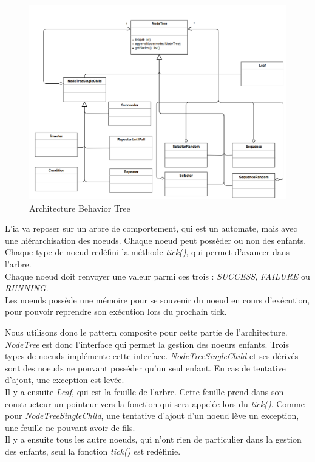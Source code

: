 \begin{figure}[H]
    \centering
    \includegraphics[scale=0.3]{data/archi/archi_nodetree.png}
    \caption{Architecture Behavior Tree}
    \label{}
\end{figure}

L'ia va reposer sur un arbre de comportement, qui est un automate, mais avec une hiérarchisation des noeuds. Chaque noeud peut posséder ou non des enfants. Chaque type de noeud redéfini la méthode \textit{tick()}, qui permet d'avancer dans l'arbre.\\
Chaque noeud doit renvoyer une valeur parmi ces trois : \textit{SUCCESS}, \textit{FAILURE} ou \textit{RUNNING}.\\
Les noeuds possède une mémoire pour se souvenir du noeud en cours d'exécution, pour pouvoir reprendre son exécution lors du prochain tick.

Nous utilisons donc le pattern composite pour cette partie de l'architecture. \textit{NodeTree} est donc l'interface qui permet la gestion des noeurs enfants. Trois types de noeuds implémente cette interface. \textit{NodeTreeSingleChild} et ses dérivés sont des noeuds ne pouvant posséder qu'un seul enfant. En cas de tentative d'ajout, une exception est levée.\\
Il y a ensuite \textit{Leaf}, qui est la feuille de l'arbre. Cette feuille prend dans son constructeur un pointeur vers la fonction qui sera appelée lors du \textit{tick()}. Comme pour \textit{NodeTreeSingleChild}, une tentative d'ajout d'un noeud lève un exception, une feuille ne pouvant avoir de fils.\\
Il y a ensuite tous les autre noeuds, qui n'ont rien de particulier dans la gestion des enfants, seul la fonction \textit{tick()} est redéfinie.

